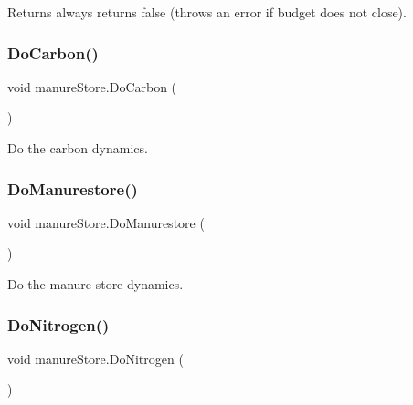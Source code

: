 \begin{DoxyReturn}{Returns}
always returns false (throws an error if budget does not close). 
\end{DoxyReturn}
\mbox{\label{classmanure_store_a4d1191eaab06551dece64f91c207e3f5}} 
\subsubsection{\texorpdfstring{DoCarbon()}{DoCarbon()}}
{\footnotesize\ttfamily void manure\+Store.\+Do\+Carbon (\begin{DoxyParamCaption}{ }\end{DoxyParamCaption})\hspace{0.3cm}{\ttfamily [inline]}}



Do the carbon dynamics. 

\mbox{\label{classmanure_store_a82539494f37b506deb4c398558b7d9a3}} 
\subsubsection{\texorpdfstring{DoManurestore()}{DoManurestore()}}
{\footnotesize\ttfamily void manure\+Store.\+Do\+Manurestore (\begin{DoxyParamCaption}{ }\end{DoxyParamCaption})\hspace{0.3cm}{\ttfamily [inline]}}



Do the manure store dynamics. 

\mbox{\label{classmanure_store_aada25a32d476b57dbeebd25786d5b0bf}} 
\subsubsection{\texorpdfstring{DoNitrogen()}{DoNitrogen()}}
{\footnotesize\ttfamily void manure\+Store.\+Do\+Nitrogen (\begin{DoxyParamCaption}{ }\end{DoxyParamCaption})\hspace{0.3cm}{\ttfamily [inline]}}



